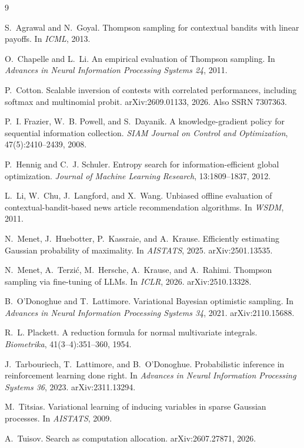 \documentclass[11pt]{article}
\begin{document}
\begin{thebibliography}{9}

 S.~Agrawal and
N.~Goyal. Thompson sampling for contextual bandits with linear
payoffs. In \emph{ICML}, 2013.

 O.~Chapelle and L.~Li.
An empirical evaluation of Thompson sampling. In \emph{Advances in
Neural Information Processing Systems 24}, 2011.

 P.~Cotton. Scalable inversion of
contests with correlated performances, including softmax and
multinomial probit. arXiv:2609.01133, 2026. Also SSRN 7307363.

P.~I. Frazier, W.~B. Powell, and S.~Dayanik. A knowledge-gradient
policy for sequential information collection. \emph{SIAM Journal on
Control and Optimization}, 47(5):2410--2439, 2008.

 P.~Hennig and
C.~J. Schuler. Entropy search for information-efficient global
optimization. \emph{Journal of Machine Learning Research},
13:1809--1837, 2012.

 L.~Li,
W.~Chu, J.~Langford, and X.~Wang. Unbiased offline evaluation of
contextual-bandit-based news article recommendation algorithms. In
\emph{WSDM}, 2011.

 N.~Menet, J.~Huebotter, P.~Kassraie, and
A.~Krause. Efficiently estimating Gaussian probability of maximality.
In \emph{AISTATS}, 2025. arXiv:2501.13535.

 N.~Menet, A.~Terzi\'c, M.~Hersche, A.~Krause, and
A.~Rahimi. Thompson sampling via fine-tuning of LLMs. In
\emph{ICLR}, 2026. arXiv:2510.13328.

B.~O'Donoghue and T.~Lattimore. Variational Bayesian optimistic
sampling. In \emph{Advances in Neural Information Processing Systems
34}, 2021. arXiv:2110.15688.

 R.~L. Plackett. A reduction
formula for normal multivariate integrals. \emph{Biometrika},
41(3--4):351--360, 1954.

 J.~Tarbouriech, T.~Lattimore, and
B.~O'Donoghue. Probabilistic inference in reinforcement learning done
right. In \emph{Advances in Neural Information Processing Systems
36}, 2023. arXiv:2311.13294.

 M.~Titsias. Variational
learning of inducing variables in sparse Gaussian processes. In
\emph{AISTATS}, 2009.

 A.~Tuisov. Search as computation
allocation. arXiv:2607.27871, 2026.

\end{thebibliography}
\end{document}
